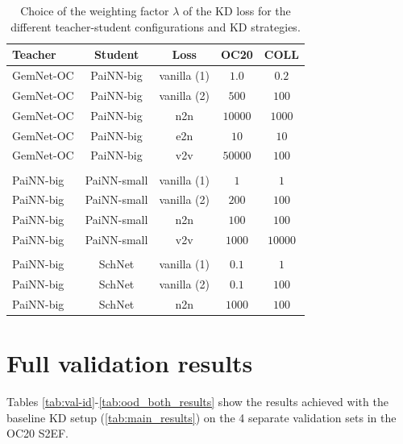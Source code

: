 \documentclass{article}
\begin{document}
\begin{table}[H]
\centering
\caption{Choice of the weighting factor $\lambda$ of the KD loss for the different teacher-student configurations and KD strategies.}
\begin{tabular}{lcccc}
\label{tab:KD_hypers}
Teacher & Student & Loss & OC20 & COLL\\\hline
GemNet-OC & PaiNN-big & vanilla (1) & $1.0$ & $0.2$\\
GemNet-OC & PaiNN-big & vanilla (2) & $500$ & $100$ \\
GemNet-OC & PaiNN-big & n2n         & $10000$ & $1000$ \\
GemNet-OC & PaiNN-big & e2n         & $10$ & $10$ \\
GemNet-OC & PaiNN-big & v2v         & $50000$ & $100$ \\\\

PaiNN-big & PaiNN-small & vanilla (1) & $1$ & $1$ \\
PaiNN-big & PaiNN-small & vanilla (2) & $200$ & $100$ \\
PaiNN-big & PaiNN-small & n2n & $100$ & $100$ \\
PaiNN-big & PaiNN-small & v2v & $1000$& $10000$ \\\\

PaiNN-big & SchNet & vanilla (1) & $0.1$ & $1$ \\
PaiNN-big & SchNet & vanilla (2) & $0.1$ & $100$ \\
PaiNN-big & SchNet & n2n & $1000$ & $100$ \\
\end{tabular}
\end{table}

\section{Full validation results} 
\label{ap:main_results_full}

Tables \ref{tab:val-id}-\ref{tab:ood_both_results} show the results achieved with the baseline KD setup (\cref{tab:main_results}) on the 4 separate validation sets in the OC20 S2EF.
\end{document}

